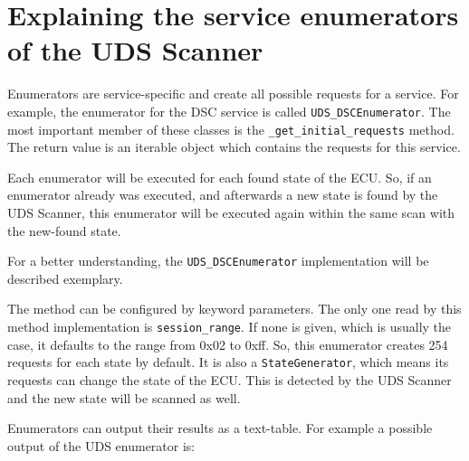 \section{Explaining the service enumerators of the UDS Scanner}


Enumerators are service-specific and create all possible requests for a service.
For example, the enumerator for the DSC service is called \texttt{UDS_DSCEnumerator}. The most important member of these classes is the \texttt{_get_initial_requests} method. The return value is an iterable object which contains the requests for this service.

Each enumerator will be executed for each found state of the ECU. So, if an enumerator already was executed, and afterwards a new state is found by the UDS Scanner, this enumerator will be executed again within the same scan with the new-found state.

For a better understanding, the \texttt{UDS_DSCEnumerator} implementation will be described exemplary.


The method can be configured by keyword parameters. The only one read by this method implementation is \texttt{session_range}. If none is given, which is usually the case, it defaults to the range from 0x02 to 0xff. So, this enumerator creates 254 requests for each state by default. It is also a \texttt{StateGenerator}, which means its requests can change the state of the ECU. This is detected by the UDS Scanner and the new state will be scanned as well.

Enumerators can output their results as a text-table. For example a possible output of the UDS enumerator is:

